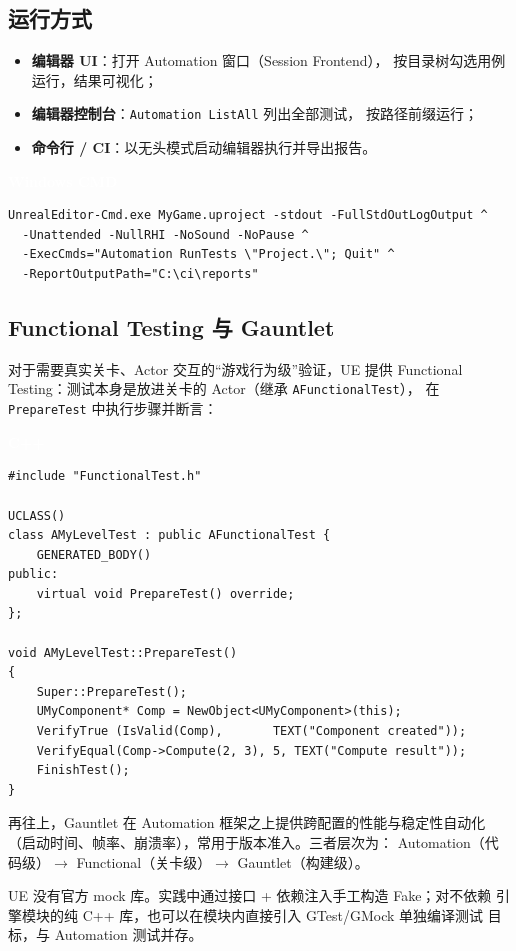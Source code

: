 \documentclass[12pt,a4paper,fontset=fandol]{ctexbook}
\newcommand{\cpplabel}{%
  \begin{tcolorbox}[enhanced,colback=cppheadbg,colframe=cppheadbg,
    arc=1mm,boxrule=0mm,left=6pt,right=6pt,top=2pt,bottom=2pt,
    halign=left,oversize]
    \textcolor{white}{\small\bfseries C++}
  \end{tcolorbox}\vspace{-4pt}}
\newcommand{\cmdlabel}{%
  \begin{tcolorbox}[enhanced,colback=black!60,colframe=black!60,
    arc=1mm,boxrule=0mm,left=6pt,right=6pt,top=2pt,bottom=2pt,
    halign=left,oversize]
    \textcolor{white}{\small\bfseries Windows CMD}
  \end{tcolorbox}\vspace{-4pt}}
\begin{document}
\subsection{运行方式}

\begin{itemize}
  \item \textbf{编辑器 UI}：打开 Automation 窗口（Session Frontend），
        按目录树勾选用例运行，结果可视化；
  \item \textbf{编辑器控制台}：\texttt{Automation ListAll} 列出全部测试，
         按路径前缀运行；
  \item \textbf{命令行 / CI}：以无头模式启动编辑器执行并导出报告。
\end{itemize}

\cmdlabel
\begin{lstlisting}
UnrealEditor-Cmd.exe MyGame.uproject -stdout -FullStdOutLogOutput ^
  -Unattended -NullRHI -NoSound -NoPause ^
  -ExecCmds="Automation RunTests \"Project.\"; Quit" ^
  -ReportOutputPath="C:\ci\reports"
\end{lstlisting}

\subsection{Functional Testing 与 Gauntlet}

对于需要真实关卡、Actor 交互的“游戏行为级”验证，UE 提供 Functional
Testing：测试本身是放进关卡的 Actor（继承 \texttt{AFunctionalTest}），
在 \texttt{PrepareTest} 中执行步骤并断言：

\cpplabel
\begin{lstlisting}
#include "FunctionalTest.h"

UCLASS()
class AMyLevelTest : public AFunctionalTest {
    GENERATED_BODY()
public:
    virtual void PrepareTest() override;
};

void AMyLevelTest::PrepareTest()
{
    Super::PrepareTest();
    UMyComponent* Comp = NewObject<UMyComponent>(this);
    VerifyTrue (IsValid(Comp),       TEXT("Component created"));
    VerifyEqual(Comp->Compute(2, 3), 5, TEXT("Compute result"));
    FinishTest();
}
\end{lstlisting}

再往上，Gauntlet 在 Automation 框架之上提供跨配置的性能与稳定性自动化
（启动时间、帧率、崩溃率），常用于版本准入。三者层次为：
Automation（代码级）$\to$ Functional（关卡级）$\to$ Gauntlet（构建级）。

\begin{note}
UE 没有官方 mock 库。实践中通过接口 + 依赖注入手工构造 Fake；对不依赖
引擎模块的纯 C++ 库，也可以在模块内直接引入 GTest/GMock 单独编译测试
目标，与 Automation 测试并存。
\end{note}
\end{document}
